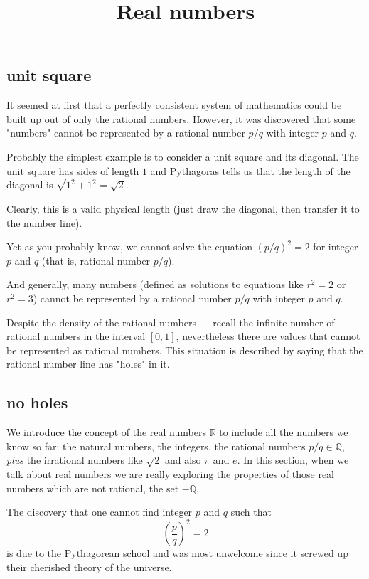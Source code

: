 \documentclass[11pt, oneside]{article}
\title{Real numbers}
\date{}
\begin{document}
\maketitle
\Large

\subsection*{unit square}

It seemed at first that a perfectly consistent system of mathematics could be built up out of only the rational numbers.  However, it was discovered that some "numbers" cannot be represented by a rational number $p/q$ with integer $p$ and $q$.

Probably the simplest example is to consider a unit square and its diagonal.  The unit square has sides of length $1$ and Pythagoras tells us that the length of the diagonal is $\sqrt{1^2 + 1^2} = \sqrt{2}$.

Clearly, this is a valid physical length (just draw the diagonal, then transfer it to the number line).

Yet as you probably know, we cannot solve the equation $(p/q)^2 = 2$ for integer $p$ and $q$ (that is, rational number $p/q$).

And generally, many numbers (defined as solutions to equations like $r^2 = 2$ or $r^2 = 3$) cannot be represented by a rational number $p/q$ with integer $p$ and $q$.  

Despite the density of the rational numbers --- recall the infinite number of rational numbers in the interval $[0,1]$, nevertheless there are values that cannot be represented as rational numbers.  This situation is described by saying that the rational number line has "holes" in it.

\subsection*{no holes}

We introduce the concept of the real numbers $\mathbb{R}$ to include all the numbers we know so far: the natural numbers, the integers, the rational numbers $p/q \in \mathbb{Q}$, \emph{plus} the irrational numbers like $\sqrt{2}$ and also $\pi$ and $e$.  In this section, when we talk about real numbers we are really exploring the properties of those real numbers which are not rational, the set $- \mathbb{Q}$. 

The discovery that one cannot find integer $p$ and $q$ such that
\[ (\frac{p}{q})^2 = 2 \]
is due to the Pythagorean school and was most unwelcome since it screwed up their cherished theory of the universe.
\end{document}
